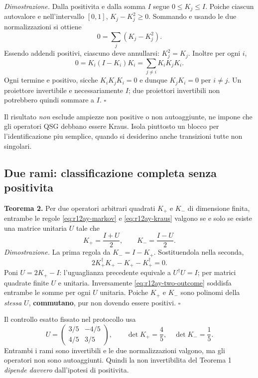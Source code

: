 \documentclass[11pt,a4paper]{article}
\begin{document}
\textit{Dimostrazione.} Dalla positivita e dalla somma $I$ segue $0\le K_j\le I$. Poiche ciascun autovalore e nell'intervallo $[0,1]$, $K_j-K_j^2\ge0$. Sommando e usando le due normalizzazioni si ottiene
\begin{equation}
 0=\sum_j(K_j-K_j^2).
 \label{eq:r12ay-positive-sum}
\end{equation}
Essendo addendi positivi, ciascuno deve annullarsi: $K_j^2=K_j$. Inoltre per ogni $i$,
\begin{equation}
 0=K_i(I-K_i)K_i=\sum_{j\ne i}K_iK_jK_i.
\end{equation}
Ogni termine e positivo, sicche $K_iK_jK_i=0$ e dunque $K_jK_i=0$ per $i\ne j$. Un proiettore invertibile e necessariamente $I$; due proiettori invertibili non potrebbero quindi sommare a $I$. $\square$

Il risultato \emph{non} esclude ampiezze non positive o non autoaggiunte, ne impone che gli operatori QSG debbano essere Kraus. Isola piuttosto un blocco per l'identificazione piu semplice, quando si desiderino anche transizioni tutte non singolari.

\subsection{Due rami: classificazione completa senza positivita}
\textbf{Teorema 2.} Per due operatori arbitrari quadrati $K_+$ e $K_-$ di dimensione finita, entrambe le regole \eqref{eq:r12ay-markov} e \eqref{eq:r12ay-kraus} valgono se e solo se esiste una matrice unitaria $U$ tale che
\begin{equation}
 K_+=\frac{I+U}{2},\qquad K_-=\frac{I-U}{2}.
 \label{eq:r12ay-two-outcome}
\end{equation}
\textit{Dimostrazione.} La prima regola da $K_-=I-K_+$. Sostituendola nella seconda,
\begin{equation}
 2K_+^\dagger K_+-K_+-K_+^\dagger=0.
\end{equation}
Poni $U=2K_+-I$: l'uguaglianza precedente equivale a $U^\dagger U=I$; per matrici quadrate finite $U$ e unitaria. Inversamente \eqref{eq:r12ay-two-outcome} soddisfa entrambe le somme per ogni $U$ unitaria. Poiche $K_+$ e $K_-$ sono polinomi della \emph{stessa} $U$, \textbf{commutano}, pur non dovendo essere positivi. $\square$

Il controllo esatto fissato nel protocollo usa
\begin{equation}
 U=\begin{pmatrix}3/5&-4/5\\4/5&3/5\end{pmatrix},\qquad
 \det K_+=\frac45,\quad\det K_-=\frac15.
\end{equation}
Entrambi i rami sono invertibili e le due normalizzazioni valgono, ma gli operatori non sono autoaggiunti. Quindi la non invertibilita del Teorema 1 \emph{dipende davvero} dall'ipotesi di positivita.
\end{document}

